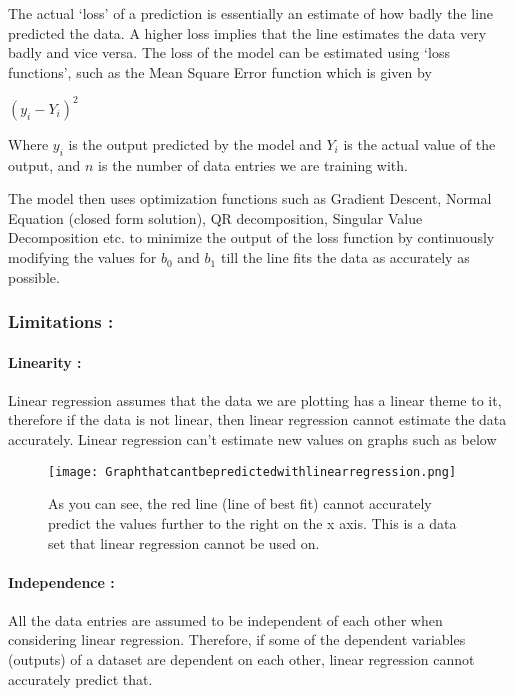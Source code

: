 \documentclass{article}
\begin{document}
The actual ‘loss’ of a prediction is essentially an estimate of how badly the line predicted the data. A higher loss implies that the line estimates the data very badly and vice versa. The loss of the model can be estimated using ‘loss functions’, such as the Mean Square Error function which is given by 
\begin{center} 
\((y_i - Y_i)^2\) 
\end{center}
Where \(y_i\) is the output predicted by the model and \(Y_i\) is the actual value of the output, and \(n\) is the number of data entries we are training with.

The model then uses optimization functions such as Gradient Descent, Normal Equation (closed form solution), QR decomposition, Singular Value Decomposition etc. to minimize the output of the loss function by continuously modifying the values for $b_0$ and $b_1$ till the line fits the data as accurately as possible.

\subsubsection{Limitations : }
\paragraph{Linearity :} Linear regression assumes that the data we are plotting has a linear theme to it, therefore if the data is not linear, then linear regression cannot estimate the data accurately. Linear
regression can’t estimate new values on graphs such as below
 
\begin{figure}
    \centering
    \texttt{[image: Graphthatcantbepredictedwithlinearregression.png]}
    \caption{As you can see, the red line (line of best fit) cannot accurately predict the values further to the right on the x axis. This is a data set that
linear regression cannot be used on.
}
    \label{fig:enter-label}
\end{figure}


\paragraph{Independence :} All the data entries are assumed to be independent of each other when considering linear regression. Therefore, if some of the dependent variables (outputs) of a dataset are dependent on each other, linear regression cannot accurately predict that.
\end{document}
